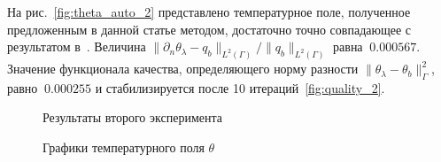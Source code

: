 \documentclass[12pt]{article}
\begin{document}
    На рис.~\ref{fig:theta_auto_2} представлено температурное поле, полученное
    предложенным в данной статье методом, достаточно точно совпадающее с результатом в~\cite{CNSNS19}.
    Величина $\|\partial_n\theta_\lambda-q_b\|_{L^2(\Gamma)}/\|q_b\|_{L^2(\Gamma)}$ равна $~0.000567$.
    Значение функционала качества, определяющего норму разности $\|\theta_\lambda -\theta_b\|^2_\Gamma$,
    равно $~0.000255$ и стабилизируется после 10 итераций~\ref{fig:quality_2}.

    \begin{figure}[H]
        \centering
        \caption{Результаты второго эксперимента}
    \end{figure}

    \begin{figure}[H]
        \centering
        \caption{Графики температурного поля $\theta$}
    \end{figure}
\end{document}

